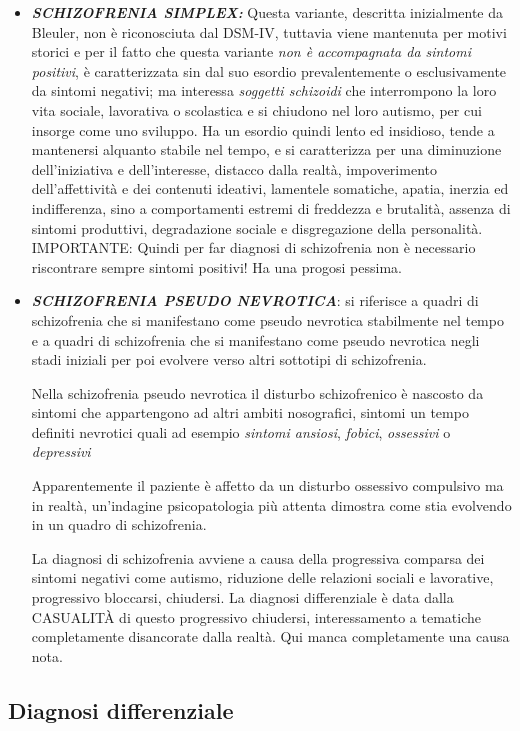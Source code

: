 \begin{itemize}
\item
  \textbf{\emph{SCHIZOFRENIA SIMPLEX:}} Questa variante, descritta
  inizialmente da Bleuler, non è riconosciuta dal DSM-IV, tuttavia viene
  mantenuta per motivi storici e per il fatto che questa variante
  \emph{non è accompagnata da sintomi positivi}, è caratterizzata sin
  dal suo esordio prevalentemente o esclusivamente da sintomi negativi;
  ma interessa \emph{soggetti schizoidi} che interrompono la loro vita
  sociale, lavorativa o scolastica e si chiudono nel loro autismo, per
  cui insorge come uno sviluppo. Ha un esordio quindi lento ed
  insidioso, tende a mantenersi alquanto stabile nel tempo, e si
  caratterizza per una diminuzione dell'iniziativa e dell'interesse,
  distacco dalla realtà, impoverimento dell'affettività e dei contenuti
  ideativi, lamentele somatiche, apatia, inerzia ed indifferenza, sino a
  comportamenti estremi di freddezza e brutalità, assenza di sintomi
  produttivi, degradazione sociale e disgregazione della personalità.
  IMPORTANTE: Quindi per far diagnosi di schizofrenia non è necessario
  riscontrare sempre sintomi positivi! Ha una progosi pessima.
\item
  \textbf{\emph{SCHIZOFRENIA PSEUDO NEVROTICA}}: si riferisce a quadri
  di schizofrenia che si manifestano come pseudo nevrotica stabilmente
  nel tempo e a quadri di schizofrenia che si manifestano come pseudo
  nevrotica negli stadi iniziali per poi evolvere verso altri sottotipi
  di schizofrenia.

Nella schizofrenia pseudo nevrotica il disturbo schizofrenico è nascosto
da sintomi che appartengono ad altri ambiti nosografici, sintomi un
tempo definiti nevrotici quali ad esempio \emph{sintomi ansiosi},
\emph{fobici}, \emph{ossessivi} o \emph{depressivi}

Apparentemente il paziente è affetto da un disturbo ossessivo compulsivo
ma in realtà, un'indagine psicopatologia più attenta dimostra come stia
evolvendo in un quadro di schizofrenia.

La diagnosi di schizofrenia avviene a causa della progressiva comparsa
dei sintomi negativi come autismo, riduzione delle relazioni sociali e
lavorative, progressivo bloccarsi, chiudersi. La diagnosi differenziale
è data dalla CASUALITÀ di questo progressivo chiudersi, interessamento a
tematiche completamente disancorate dalla realtà. Qui manca
completamente una causa nota.
\end{itemize}

\subsection{Diagnosi differenziale}

